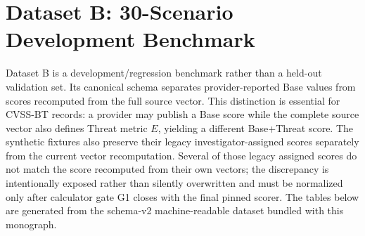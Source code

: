 \section{Dataset B: 30-Scenario Development Benchmark}
\label{sec:app_modern_benchmark}
Dataset B is a development/regression benchmark rather than a held-out validation set. Its canonical schema separates provider-reported Base values from scores recomputed from the full source vector. This distinction is essential for CVSS-BT records: a provider may publish a Base score while the complete source vector also defines Threat metric $E$, yielding a different Base+Threat score. The synthetic fixtures also preserve their legacy investigator-assigned scores separately from the current vector recomputation. Several of those legacy assigned scores do not match the score recomputed from their own vectors; the discrepancy is intentionally exposed rather than silently overwritten and must be normalized only after calculator gate G1 closes with the final pinned scorer. The tables below are generated from the schema-v2 machine-readable dataset bundled with this monograph.


